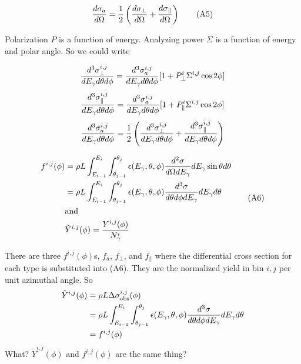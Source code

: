 \documentclass{article}
\begin{document}
\begin{equation}
{d\sigma_a \over d\Omega} = {1 \over 2} \left( {d\sigma_\perp \over d\Omega} + {d\sigma_\parallel \over d\Omega} \right) \tag{A5} \\
\end{equation}

Polarization $P$ is a function of energy. Analyzing power $\Sigma$ is a function of energy and polar angle. So we could write

\begin{equation}
{d^3\sigma^{i,j}_\perp \over dE_\gamma d\theta d\phi} = {d^3\sigma^{i,j}_a \over dE_\gamma d\theta d\phi}[1+P^i_\perp\Sigma^{i,j}\cos 2\phi] \\
\end{equation}
\begin{equation}
{d^3\sigma^{i,j}_\parallel \over dE_\gamma d\theta d\phi} = {d^3\sigma^{i,j}_a \over dE_\gamma d\theta d\phi}[1+P^i_\parallel\Sigma^{i,j}\cos 2\phi] \\
\end{equation}
\begin{equation}
  {d^3\sigma^{i,j}_a \over dE_\gamma d\theta d\phi}
  = {1 \over 2} \left( {d^3\sigma^{i,j}_\perp \over dE_\gamma d\theta d\phi}
  + {d^3\sigma^{i,j}_\parallel \over dE_\gamma d\theta d\phi} \right)
\end{equation}

\begin{equation}
  \begin{split}
f^{i,j}(\phi) & = \rho L\int^{E_i}_{E_{i-1}}\int_{\theta_{j-1}}^{\theta_j} \epsilon(E_\gamma,\theta,\phi) {d^2\sigma \over d\Omega dE_\gamma} dE_\gamma \sin\theta d\theta \\
& = \rho L\int^{E_i}_{E_{i-1}}\int_{\theta_{j-1}}^{\theta_j} \epsilon(E_\gamma,\theta,\phi) {d^3\sigma \over d\theta d\phi dE_\gamma} dE_\gamma d\theta \\
& {\rm and} \\
& \tilde Y^{i,j}(\phi) = {Y^{i,j}(\phi) \over N^i_\gamma}
\end{split} \tag{A6}
\end{equation}

There are three $f^{i,j}(\phi)$s, $f_a$, $f_\perp$, and $f_\parallel$ where the differential cross section for each type is substituted into (A6). They are the normalized yield in bin $i,j$ per unit azimuthal angle. So
\begin{equation}
  \begin{split}
    \tilde Y^{i,j}(\phi) & = \rho L\Delta\sigma^{i,j}_{\rm obs}(\phi) \\
    & = \rho L\int^{E_i}_{E_{i-1}}\int_{\theta_{j-1}}^{\theta_j} \epsilon(E_\gamma,\theta,\phi) {d^3\sigma \over d\theta d\phi dE_\gamma} dE_\gamma d\theta \\
    & = f^{i,j}(\phi)
  \end{split}
\end{equation}
What? $\tilde Y^{i,j}(\phi)$ and $f^{i,j}(\phi)$ are the same thing?
\end{document}
